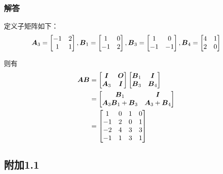 \documentclass{beamer}
\begin{document}
\begin{frame}
\frametitle{解答}

    定义子矩阵如下：
    \begin{equation*}
        \boldsymbol{A}_3=
        \begin{bmatrix}
            -1 & 2 \\1&1
        \end{bmatrix},
        \boldsymbol{B}_1=
        \begin{bmatrix}
            1 & 0 \\-1&2
        \end{bmatrix},
        \boldsymbol{B}_3=
        \begin{bmatrix}
            1 & 0 \\-1&-1
        \end{bmatrix},
        \boldsymbol{B}_4=
        \begin{bmatrix}
            4 & 1 \\2&0
        \end{bmatrix}
    \end{equation*}

    则有
    \begin{align*}
        \boldsymbol{A}\boldsymbol{B} & =
        \begin{bmatrix}
            \boldsymbol{I} & \boldsymbol{O} \\\boldsymbol{A}_3&\boldsymbol{I}
        \end{bmatrix}
        \begin{bmatrix}
            \boldsymbol{B}_1 & \boldsymbol{I} \\\boldsymbol{B}_3&\boldsymbol{B}_4
        \end{bmatrix} \\&=
        \begin{bmatrix}
            \boldsymbol{B}_1 & \boldsymbol{I} \\\boldsymbol{A}_3\boldsymbol{B}_1+\boldsymbol{B}_3&\boldsymbol{A}_3+\boldsymbol{B}_4
        \end{bmatrix} \\&=
        \begin{bmatrix}
            1  & 0 & 1 & 0 \\
            -1 & 2 & 0 & 1 \\
            -2 & 4 & 3 & 3 \\
            -1 & 1 & 3 & 1
        \end{bmatrix}
    \end{align*}

\end{frame}

\subsection*{附加1.1}
\end{document}
